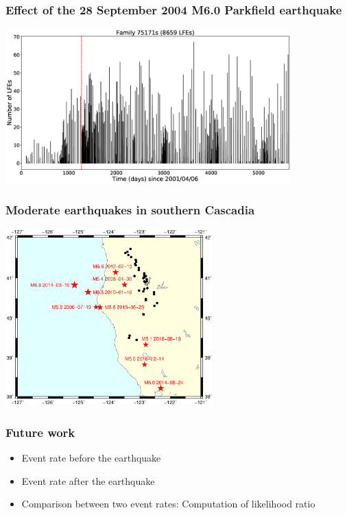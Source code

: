 \documentclass{beamer}
\begin{document}
	\begin{frame}
		\frametitle{Effect of the 28 September 2004 M6.0 Parkfield earthquake}
		\begin{center}
			\includegraphics[width=11cm, trim={0cm 0cm 0cm 0cm}, clip]{LFE_catalogs/75171s_Parkfield.eps}
		\end{center}
	\end{frame}

	\begin{frame}
		\frametitle{Moderate earthquakes in southern Cascadia}
		\begin{center}
			\includegraphics[trim={1cm 4cm 1cm 10cm}, clip, width=8cm]{catalog_SC/earthquakes_map.eps}
		\end{center}
	\end{frame}

	\begin{frame}
		\frametitle{Future work}
		\begin{itemize}
			\item Event rate before the earthquake
			\item Event rate after the earthquake
			\item Comparison between two event rates: Computation of likelihood ratio
		\end{itemize}
	\end{frame}
\end{document}
